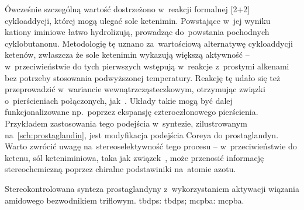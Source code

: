 Ówcześnie szczególną wartość dostrzeżono w~reakcji formalnej [2+2] cykloaddycji, której mogą ulegać sole ketenimin.
Powstające w~jej wyniku kationy iminiowe łatwo hydrolizują, prowadząc do~powstania pochodnych cyklobutanonu.
Metodologię tę uznano za~wartościową alternatywę cykloaddycji ketenów, zwłaszcza że sole ketenimin wykazują większą aktywność \---
  w~przeciwieństwie do tych pierwszych wstępują w~reakcje z~prostymi alkenami bez potrzeby stosowania podwyższonej temperatury.
Reakcję tę udało się też przeprowadzić w~wariancie wewnątrzcząsteczkowym,
  otrzymując związki o~pierścieniach połączonych, jak~.
Układy takie mogą być dalej funkcjonalizowane np.~poprzez ekspansję czteroczłonowego pierścienia.
Przykładem zastosowania tego podejścia w~syntezie, zilustrowanym na~\cref{sch:prostaglandin}, jest modyfikacja podejścia Coreya do prostaglandyn.
Warto zwrócić uwagę na~stereoselektywność tego procesu \--- w~przeciwieństwie do ketenu,
  sól keteniminiowa, taka jak związek~, może przenosić informację stereochemiczną poprzez chiralne podstawiniki na~atomie azotu.
\begin{scheme*}
  \centering
  
  \caption{
    Stereokontrolowana synteza prostaglandyny z~wykorzystaniem aktywacji wiązania amidowego bezwodnikiem triflowym.
    \acrshort{tbdps}: \acrlong{tbdps}; \acrshort{mcpba}: \acrlong{mcpba}.
  }
  \label{sch:prostaglandin}
\end{scheme*}

